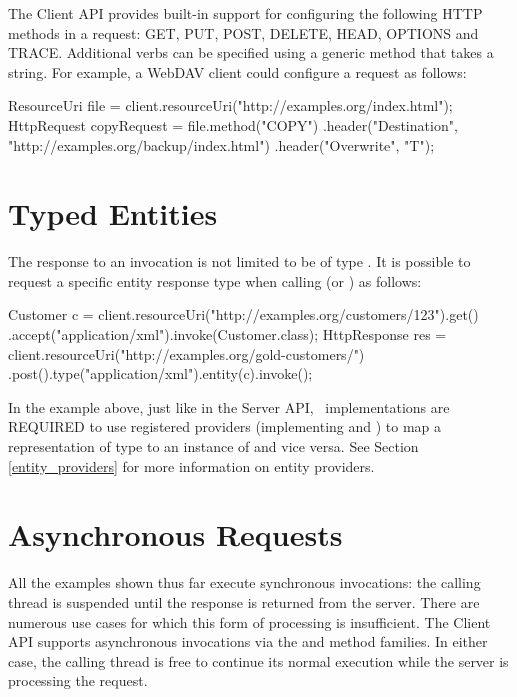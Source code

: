 The Client API provides built-in support for configuring the following HTTP methods in a request: GET, PUT, POST, DELETE, HEAD, OPTIONS and TRACE. Additional verbs can be specified using a generic method that takes a string. For example, a WebDAV client could configure a request as follows:

\begin{listing}{1}
ResourceUri file = client.resourceUri("http://examples.org/index.html");
HttpRequest copyRequest = file.method("COPY") 
    .header("Destination", "http://examples.org/backup/index.html")
    .header("Overwrite", "T");
\end{listing}

\section{Typed Entities}

The response to an invocation is not limited to be of type \HttpResponse. It is possible to request a specific entity response type when calling  (or ) as follows:

\begin{listing}{1}
Customer c = client.resourceUri("http://examples.org/customers/123").get()
    .accept("application/xml").invoke(Customer.class);
HttpResponse res = client.resourceUri("http://examples.org/gold-customers/")
    .post().type("application/xml").entity(c).invoke();
\end{listing}

In the example above, just like in the Server API, \jaxrs\ implementations are REQUIRED to use registered providers (implementing  and ) to map a representation of type  to an instance of  and vice versa. See Section \ref{entity_providers} for more information on entity providers.

\section{Asynchronous Requests}

All the examples shown thus far execute synchronous invocations: the calling thread is suspended until the response is returned from the server. There are numerous use cases for which this form of processing is insufficient. The Client API supports asynchronous invocations via the  and  method families. In either case, the calling thread is free to continue its normal execution while the server is processing the request. 

